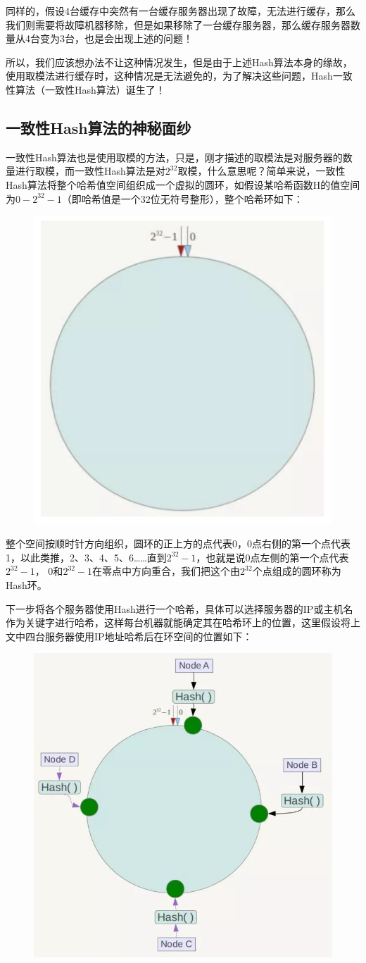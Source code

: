 \documentclass[12pt]{article}
\begin{document}
同样的，假设4台缓存中突然有一台缓存服务器出现了故障，无法进行缓存，那么我们则需要将故障机器移除，但是如果移除了一台缓存服务器，那么缓存服务器数量从4台变为3台，也是会出现上述的问题！

所以，我们应该想办法不让这种情况发生，但是由于上述Hash算法本身的缘故，使用取模法进行缓存时，这种情况是无法避免的，为了解决这些问题，Hash一致性算法（一致性Hash算法）诞生了！

\subsection{一致性Hash算法的神秘面纱}
一致性Hash算法也是使用取模的方法，只是，刚才描述的取模法是对服务器的数量进行取模，而一致性Hash算法是对$2^32$取模，什么意思呢？简单来说，一致性Hash算法将整个哈希值空间组织成一个虚拟的圆环，如假设某哈希函数H的值空间为$0-2^32-1$（即哈希值是一个32位无符号整形），整个哈希环如下：
\begin{figure}[H]
    \centering
    \includegraphics[width=.4\textwidth]{fig/Consistent_Hashing_4.png}
\end{figure}
整个空间按顺时针方向组织，圆环的正上方的点代表0，0点右侧的第一个点代表1，以此类推，2、3、4、5、6……直到$2^32-1$，也就是说0点左侧的第一个点代表$2^32-1$， 0和$2^32-1$在零点中方向重合，我们把这个由$2^32$个点组成的圆环称为Hash环。

下一步将各个服务器使用Hash进行一个哈希，具体可以选择服务器的IP或主机名作为关键字进行哈希，这样每台机器就能确定其在哈希环上的位置，这里假设将上文中四台服务器使用IP地址哈希后在环空间的位置如下：
\begin{figure}[H]
    \centering
    \includegraphics[width=.5\textwidth]{fig/Consistent_Hashing_6.jpg}
\end{figure}
\end{document}
